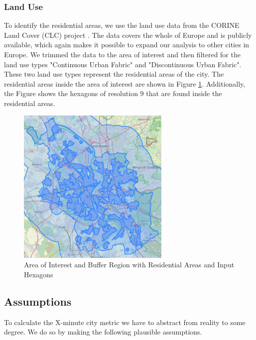 \subsubsection{Land Use}
\label{subs:land_use}

To identify the residential areas, we use the land use data from the CORINE Land Cover (CLC) project .
The data covers the whole of Europe and is publicly available, which again makes it possible to expand our analysis to other cities in Europe.
We trimmed the data to the area of interest and then filtered for the land use types "Continuous Urban Fabric" and "Discontinuous Urban Fabric".
These two land use types represent the residential areas of the city.
The residential areas inside the area of interest are shown in Figure \ref{fig:input_hexagons_residential_areas}.
Additionally, the Figure shows the hexagons of resolution 9 that are found inside the residential areas.

\begin{figure}
  \begin{center}
    \includegraphics[width=0.65\textwidth]{Figures/experiment/input_hexagons_residential_areas.png}
  \end{center}
  \caption{Area of Interest and Buffer Region with Residential Areas and Input Hexagons}
  \label{fig:input_hexagons_residential_areas}
\end{figure}


\subsection{Assumptions}
\label{subs:assumptions}

To calculate the X-minute city metric we have to abstract from reality to some degree.
We do so by making the following plausible assumptions.

